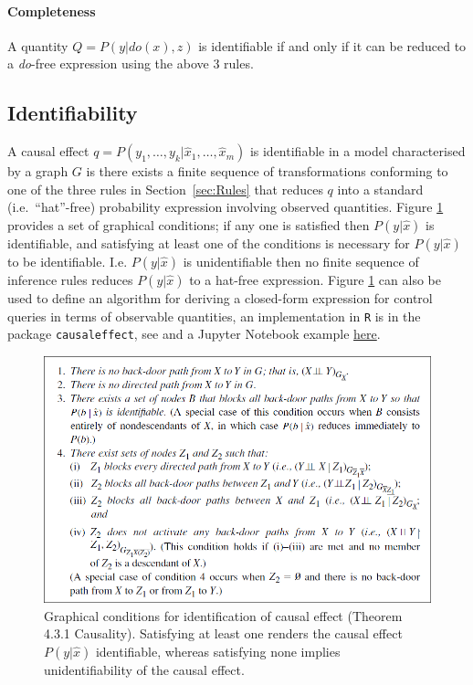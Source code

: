 \documentclass[11pt]{article}
\numberwithin{equation}{section}
\begin{document}
\paragraph{Completeness} A quantity $Q=P(y|do(x),z)$ is identifiable if and only if it can be reduced to a \textit{do}-free expression using the above 3 rules.

\subsection{Identifiability}
A causal effect $q = P(y_1, \dots, y_k| \hat{x}_1, \dots, \hat{x}_m)$ is identifiable in a model characterised by a graph $G$ is there exists a finite sequence of transformations conforming to one of the three rules in Section~\ref{sec:Rules} that reduces $q$ into a standard (i.e.\ ``hat''-free) probability expression involving observed quantities. Figure \ref{Fig:graph_cond_ci} provides a set of graphical conditions; if any one is satisfied then $P(y|\hat{x})$ is identifiable, and satisfying at least one of the conditions is necessary for $P(y|\hat{x})$ to be identifiable. I.e. $P(y|\hat{x})$ is unidentifiable then no finite sequence of inference rules reduces $P(y|\hat{x})$ to a hat-free expression. Figure \ref{Fig:graph_cond_ci} can also be used to define an algorithm for deriving a closed-form expression for control queries in terms of observable quantities, an implementation in \texttt{R} is in the package \texttt{causaleffect}, see \cite{tikka17} and a Jupyter Notebook example \href{https://github.com/jaryaman/ML_demos/blob/master/Notebooks/do-calculus.ipynb}{here}.


\begin{figure}
\begin{center}
\includegraphics[width=0.8\columnwidth]{figures/graph-cond-ident-4-3-1.png}  
\end{center}
\caption{Graphical conditions for identification of causal effect (Theorem 4.3.1 Causality). Satisfying at least one renders the causal effect $P(y|\hat{x})$ identifiable, whereas satisfying none implies unidentifiability of the causal effect.}
\label{Fig:graph_cond_ci}
\end{figure}
\end{document}
